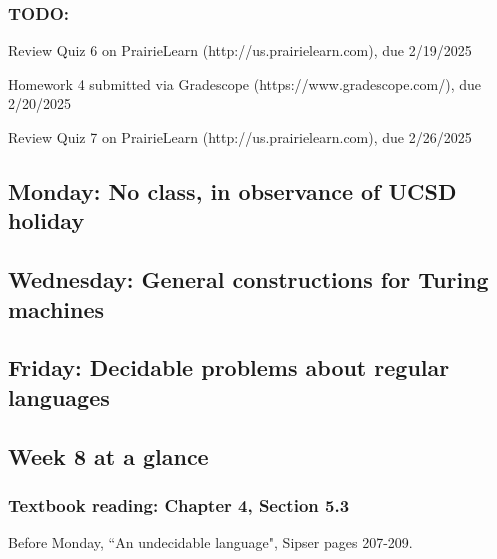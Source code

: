 \vspace{-20pt}

\subsubsection*{TODO:}
\begin{list}{\itemsep-10pt}
    \item Review Quiz 6 on PrairieLearn (http://us.prairielearn.com), due 2/19/2025
    \item Homework 4 submitted via Gradescope (https://www.gradescope.com/), due 2/20/2025
    \item Review Quiz 7 on PrairieLearn (http://us.prairielearn.com), due 2/26/2025
\end{list}

\newpage

\subsection*{Monday: No class, in observance of UCSD holiday}
\subsection*{Wednesday: General constructions for Turing machines}





\newpage
\subsection*{Friday: Decidable problems about regular languages}





\newpage

\subsection*{Week 8 at a glance}


\vspace{-20pt}

\subsubsection*{Textbook reading: Chapter 4, Section 5.3}

\vspace{-20pt}

Before Monday, ``An undecidable language", Sipser pages 207-209.

